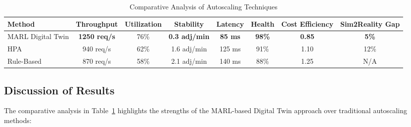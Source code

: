 \documentclass[conference]{IEEEtran}
\begin{document}
\begin{table}[h]
\centering
\caption{Comparative Analysis of Autoscaling Techniques}
\label{tab:autoscaling_comparison}
\begin{tabular}{lccccccc}
\hline
\textbf{Method} & \textbf{Throughput} & \textbf{Utilization} & \textbf{Stability} & \textbf{Latency} & \textbf{Health} & \textbf{Cost Efficiency} & \textbf{Sim2Reality Gap} \\
\hline
MARL Digital Twin & \textbf{1250 req/s} & 76\% & \textbf{0.3 adj/min} & \textbf{85 ms} & \textbf{98\%} & \textbf{0.85} & \textbf{5\%} \\
HPA & 940 req/s & 62\% & 1.6 adj/min & 125 ms & 91\% & 1.10 & 12\% \\
Rule-Based & 870 req/s & 58\% & 2.1 adj/min & 140 ms & 88\% & 1.25 & N/A \\
\hline
\end{tabular}
\end{table}

\subsection{Discussion of Results}

The comparative analysis in Table~\ref{tab:autoscaling_comparison} highlights the strengths of the MARL-based Digital Twin approach over traditional autoscaling methods:
\end{document}
